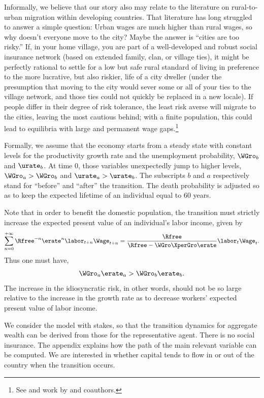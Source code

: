 \documentclass[titlepage]{\econtex}\newcommand{\texname}{cjSOE}
\begin{document}
Informally, we believe that our story also may relate to the
literature on rural-to-urban migration within developing countries.
That literature has long struggled to answer a simple question: Urban
wages are much higher than rural wages, so why doesn't everyone move
to the city?  Maybe the answer is ``cities are too risky.''  If, in
your home village, you are part of a well-developed and robust social
insurance network (based on extended family, clan, or village ties),
it might be perfectly rational to settle for a low but safe rural
standard of living in preference to the more lucrative, but also
riskier, life of a city dweller (under the presumption that moving
to the city would sever some or all of your ties to the village
network, and those ties could not quickly be replaced in a new
locale).  If people differ in their degree of risk tolerance, the
least risk averse will migrate to the cities, leaving the most
cautious behind; with a finite population, this could lead to equilibria
with large and permanent wage gaps.\footnote{See \cite{mrMobilityIndia} and
  work by \cite{townsendIndia} and coauthors.}

Formally, we assume that the economy starts from a steady state with
constant levels for the productivity growth rate and the unemployment
probability, $\WGro_b$ and $\urate_b$. At time $0$, those variables
unexpectedly jump to higher levels, $\WGro_a > \WGro_b$ and $\urate_a
> \urate_b$. The subscripts $b$ and $a$ respectively stand for
``before'' and ``after'' the transition. The death probability is
adjusted so as to keep the expected lifetime of an individual equal to
60 years.

Note that in order to benefit the domestic population, the transition must strictly increase the expected present value of an individual's labor income, given by
\begin{equation*}
\sum_{n=0}^{+\infty} \Rfree^{-n} \erate^{n} \labor_{t+n} \Wage_{t+n}= \frac{\Rfree}{\Rfree- \WGro \XperGro \erate} \labor_t \Wage_t.
\end{equation*}
Thus one must have,
\begin{equation}
\WGro_a \erate_a >\WGro_b \erate_b.
\label{eq:CondTransdyn}
\end{equation}
The increase in the idiosyncratic risk, in other words, should not be so large relative to the increase in the growth rate as to decrease workers' expected present value of labor income.

We consider the model with stakes, so that the transition dynamics for aggregate wealth can be derived from those for the representative agent. There is no social insurance. The appendix explains how the path of the main relevant variable can be computed. We are interested in whether capital tends to flow in or out of the country when the transition occurs.
\end{document}

